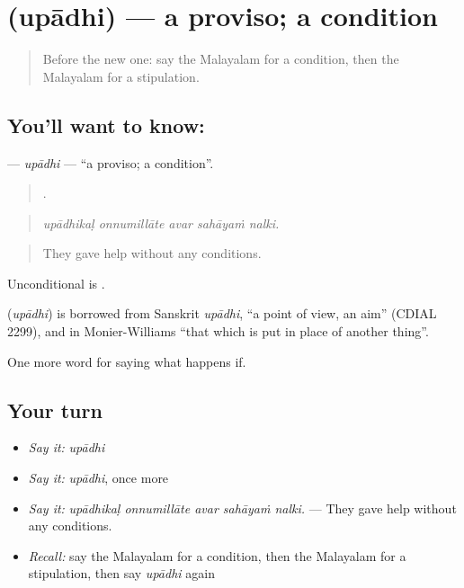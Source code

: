 \section[\texorpdfstring{\ml{ഉപാധി} (upādhi)}{ഉപാധി (upādhi)}]{ (upādhi) — a proviso; a condition}

\label{lesson:ML-C440-upadhi}



\begin{quote}
Before the new one: say the Malayalam for a condition, then the Malayalam for a stipulation.
\end{quote}

\subsection*{You'll want to know: }
\textbf{} — \emph{upādhi} — \textquotedblleft{}a proviso; a condition\textquotedblright{}.

\begin{quote}
    .
\end{quote}

\begin{quote}
\emph{upādhikaḷ onnumillāte avar sahāyaṁ nalki.}
\end{quote}

\begin{quote}
They gave help without any conditions.
\end{quote}

Unconditional is .

\begin{cousinweb}
\textbf{} (\emph{upādhi}) is borrowed from Sanskrit \emph{upādhi}, \textquotedblleft{}a point of view, an aim\textquotedblright{} (CDIAL 2299), and in Monier-Williams \textquotedblleft{}that which is put in place of another thing\textquotedblright{}.
\end{cousinweb}

\begin{grammarlens}[title={What you've built}]
One more word for saying what happens if.
\end{grammarlens}

\subsection*{Your turn}
\begin{itemize}
\raggedright
  \item \emph{Say it:} \emph{upādhi}
  \item \emph{Say it:} \emph{upādhi}, once more
  \item \emph{Say it:} \emph{upādhikaḷ onnumillāte avar sahāyaṁ nalki.} — They gave help without any conditions.
  \item \emph{Recall:} say the Malayalam for a condition, then the Malayalam for a stipulation, then say \emph{upādhi} again
\end{itemize}

